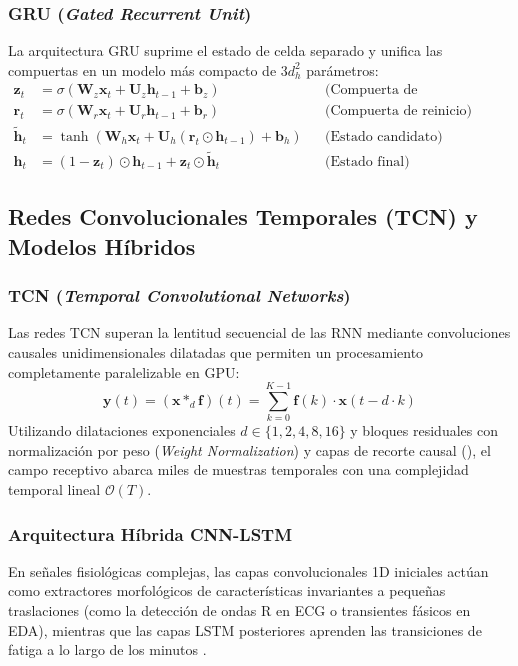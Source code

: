 \subsubsection{GRU (\textit{Gated Recurrent Unit})}
La arquitectura GRU \cite{cho2014learning} suprime el estado de celda separado y unifica las compuertas en un modelo más compacto de $3 d_h^2$ parámetros:
\begin{align}
    \bm{z}_t &= \sigma(\bm{W}_z \bm{x}_t + \bm{U}_z \bm{h}_{t-1} + \bm{b}_z) && \text{(Compuerta de actualización)} \\
    \bm{r}_t &= \sigma(\bm{W}_r \bm{x}_t + \bm{U}_r \bm{h}_{t-1} + \bm{b}_r) && \text{(Compuerta de reinicio)} \\
    \tilde{\bm{h}}_t &= \tanh(\bm{W}_h \bm{x}_t + \bm{U}_h (\bm{r}_t \odot \bm{h}_{t-1}) + \bm{b}_h) && \text{(Estado candidato)} \\
    \bm{h}_t &= (1 - \bm{z}_t) \odot \bm{h}_{t-1} + \bm{z}_t \odot \tilde{\bm{h}}_t && \text{(Estado final)}
\end{align}

\subsection{Redes Convolucionales Temporales (TCN) y Modelos Híbridos}

\subsubsection{TCN (\textit{Temporal Convolutional Networks})}
Las redes TCN \cite{bai2018empirical} superan la lentitud secuencial de las RNN mediante convoluciones causales unidimensionales dilatadas que permiten un procesamiento completamente paralelizable en GPU:
\begin{equation}
    \bm{y}(t) = (\bm{x} *_d \bm{f})(t) = \sum_{k=0}^{K-1} \bm{f}(k) \cdot \bm{x}(t - d \cdot k)
\end{equation}
Utilizando dilataciones exponenciales $d \in \{1, 2, 4, 8, 16\}$ y bloques residuales con normalización por peso (\textit{Weight Normalization}) y capas de recorte causal (), el campo receptivo abarca miles de muestras temporales con una complejidad temporal lineal $\mathcal{O}(T)$.

\subsubsection{Arquitectura Híbrida CNN-LSTM}
En señales fisiológicas complejas, las capas convolucionales 1D iniciales actúan como extractores morfológicos de características invariantes a pequeñas traslaciones (como la detección de ondas R en ECG o transientes fásicos en EDA), mientras que las capas LSTM posteriores aprenden las transiciones de fatiga a lo largo de los minutos \cite{shi2015convolutional}.

